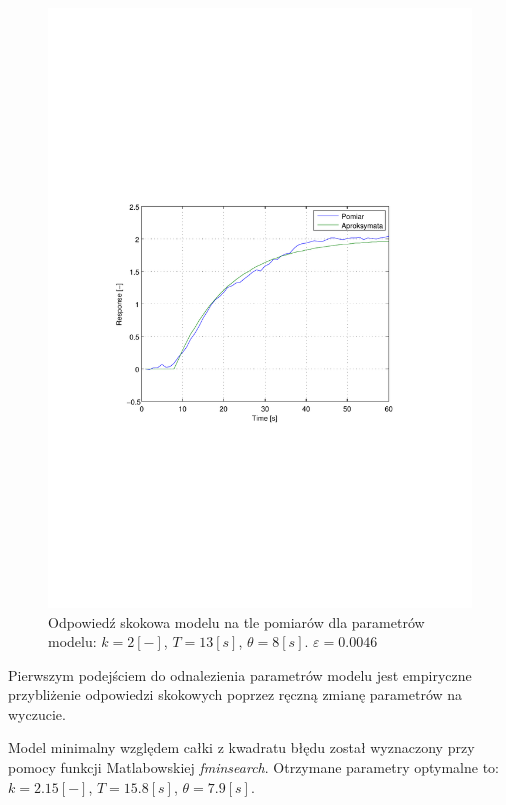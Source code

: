\documentclass[12pt]{article}
\begin{document}
\begin{figure}[!htb]
	\begin{center}
		\includegraphics[width=14cm,trim=3cm 9cm 3cm 9cm,clip]
		{../res/img/k1_2_13_8.pdf}
	\end{center}
	\caption{Odpowiedź skokowa modelu na tle pomiarów dla parametrów modelu:
	$k=2[-]$, $T=13[s]$, $\theta=8[s]$. $\varepsilon=0.0046$}
\end{figure}

Pierwszym podejściem do odnalezienia parametrów modelu jest empiryczne
przybliżenie odpowiedzi skokowych poprzez ręczną zmianę parametrów na wyczucie.

Model minimalny względem całki z kwadratu błędu został wyznaczony przy pomocy
funkcji Matlabowskiej \textit{fminsearch}. Otrzymane parametry optymalne to:
$k=2.15[-]$, $T=15.8[s]$, $\theta=7.9[s]$.
\end{document}

